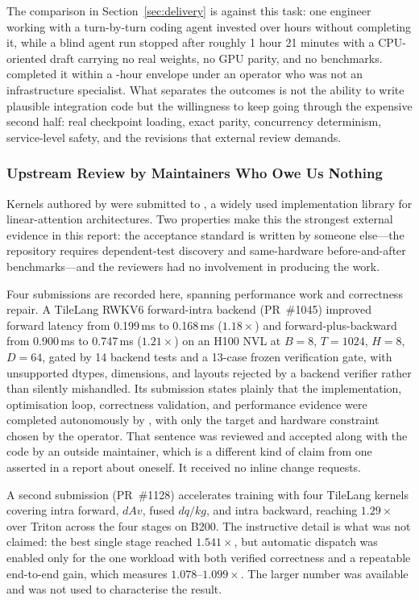 The comparison in Section~\ref{sec:delivery} is against this task: one engineer
working with a turn-by-turn coding agent invested over \SGLangHumanHours{} hours
without completing it, while a blind agent run stopped after roughly 1 hour 21
minutes with a CPU-oriented draft carrying no real weights, no GPU parity, and no
benchmarks. \systemname{} completed it within a \SGLangArgusHours{}-hour envelope
under an operator who was not an infrastructure specialist. What separates the
outcomes is not the ability to write plausible integration code but the willingness
to keep going through the expensive second half: real checkpoint loading, exact
parity, concurrency determinism, service-level safety, and the revisions that
external review demands.

\subsubsection{Upstream Review by Maintainers Who Owe Us Nothing}

Kernels authored by \systemname{} were submitted to
, a widely used implementation library for
linear-attention architectures. Two properties make this the strongest external
evidence in this report: the acceptance standard is written by someone else---the
repository requires dependent-test discovery and same-hardware before-and-after
benchmarks---and the reviewers had no involvement in producing the work.

Four submissions are recorded here, spanning performance work and correctness
repair. A TileLang RWKV6 forward-intra backend (PR~\#1045) improved forward latency from 0.199\,ms to
0.168\,ms ($1.18\times$) and forward-plus-backward from 0.900\,ms to 0.747\,ms
($1.21\times$) on an H100 NVL at $B{=}8$, $T{=}1024$, $H{=}8$, $D{=}64$, gated by 14
backend tests and a 13-case frozen verification gate, with unsupported dtypes,
dimensions, and layouts rejected by a backend verifier rather than silently
mishandled. Its submission states plainly that the implementation, optimisation
loop, correctness validation, and performance evidence were completed autonomously
by \systemname{}, with only the target and hardware constraint chosen by the
operator. That sentence was reviewed and accepted along with the code by an outside
maintainer, which is a different kind of claim from one asserted in a report about
oneself. It received no inline change requests.

A second submission (PR~\#1128) accelerates  training with four TileLang
kernels covering intra forward, $dAv$, fused $dq/kg$, and intra backward, reaching
$1.29\times$ over Triton across the four stages on B200. The instructive detail is
what was not claimed: the best single stage reached $1.541\times$, but automatic
dispatch was enabled only for the one workload with both verified correctness and a
repeatable end-to-end gain, which measures $1.078$--$1.099\times$. The larger number
was available and was not used to characterise the result.

